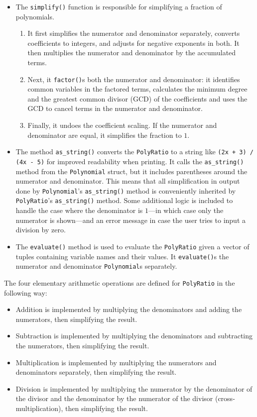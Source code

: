 \begin{itemize}
    \item The \verb|simplify()| function is responsible for simplifying a fraction of polynomials.
    
    \begin{enumerate}
        \item It first simplifies the numerator and denominator separately, converts coefficients to integers, and adjusts for negative exponents in both. It then multiplies the numerator and denominator by the accumulated terms.
        \item Next, it \verb|factor()|s both the numerator and denominator: it identifies common variables in the factored terms, calculates the minimum degree and the greatest common divisor (GCD) of the coefficients and uses the GCD to cancel terms in the numerator and denominator.
        \item Finally, it undoes the coefficient scaling. If the numerator and denominator are equal, it simplifies the fraction to $1$.
    \end{enumerate}

    \item The method \verb|as_string()| converts the \verb|PolyRatio| to a string like \texttt{(2x + 3) / (4x - 5)} for improved readability when printing. It calls the \verb|as_string()| method from the \verb|Polynomial| struct, but it includes parentheses around the numerator and denominator. This means that all simplification in output done by \verb|Polynomial|'s \verb|as_string()| method is conveniently inherited by \verb|PolyRatio|'s \verb|as_string()| method. Some additional logic is included to handle the case where the denominator is $1$---in which case only the numerator is shown---and an error message in case the user tries to input a division by zero.
    \item The \verb|evaluate()| method is used to evaluate the \verb|PolyRatio| given a vector of tuples containing variable names and their values. It \verb|evaluate()|s the numerator and denominator \verb|Polynomial|s separately.

\end{itemize}



The four elementary arithmetic operations are defined for \verb|PolyRatio| in the following way:
\begin{itemize}
    \item Addition is implemented by multiplying the denominators and adding the numerators, then simplifying the result.
    \item Subtraction is implemented by multiplying the denominators and subtracting the numerators, then simplifying the result.
    \item Multiplication is implemented by multiplying the numerators and denominators separately, then simplifying the result.
    \item Division is implemented by multiplying the numerator by the denominator of the divisor and the denominator by the numerator of the divisor (cross-multiplication), then simplifying the result. 
\end{itemize}

